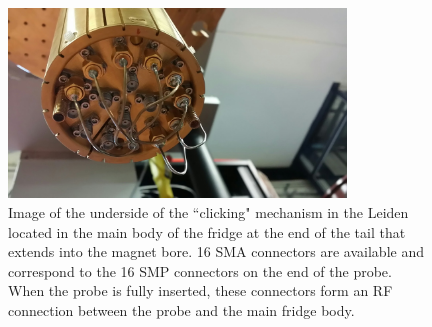\begin{figure}
\centering
\includegraphics[width = 0.8\textwidth]{figures/appendix/cryostats/Leiden_clicking.jpg}
\caption{Image of the underside of the ``clicking" mechanism in the Leiden located in the main body of the fridge at the end of the tail that extends into the magnet bore. 16 SMA connectors are available and correspond to the 16 SMP connectors on the end of the probe. When the probe is fully inserted, these connectors form an RF connection between the probe and the main fridge body.}
\label{Fig:Appen:Leiden_clicking}
\end{figure}